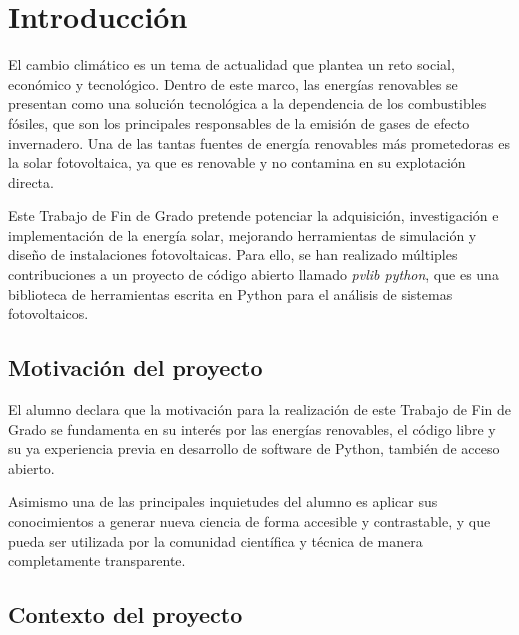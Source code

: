 \chapter{Introducción} \label{chp:intro}

El cambio climático es un tema de actualidad que plantea un reto social, económico y tecnológico. Dentro de este marco, las energías renovables se presentan como una solución tecnológica a la dependencia de los combustibles fósiles, que son los principales responsables de la emisión de gases de efecto invernadero. Una de las tantas fuentes de energía renovables más prometedoras es la solar fotovoltaica, ya que es renovable y no contamina en su explotación directa.

Este Trabajo de Fin de Grado pretende potenciar la adquisición, investigación e implementación de la energía solar, mejorando herramientas de simulación y diseño de instalaciones fotovoltaicas. Para ello, se han realizado múltiples contribuciones a un proyecto de código abierto llamado \textit{pvlib python}, que es una biblioteca de herramientas escrita en Python para el análisis de sistemas fotovoltaicos.


\section{Motivación del proyecto} \label{sct:intro:motivacion}

El alumno declara que la motivación para la realización de este Trabajo de Fin de Grado se fundamenta en su interés por las energías renovables, el código libre y su ya experiencia previa en desarrollo de software de Python, también de acceso abierto.

Asimismo una de las principales inquietudes del alumno es aplicar sus conocimientos a generar nueva ciencia de forma accesible y contrastable, y que pueda ser utilizada por la comunidad científica y técnica de manera completamente transparente.


\section{Contexto del proyecto} \label{sct:intro:contexto}

